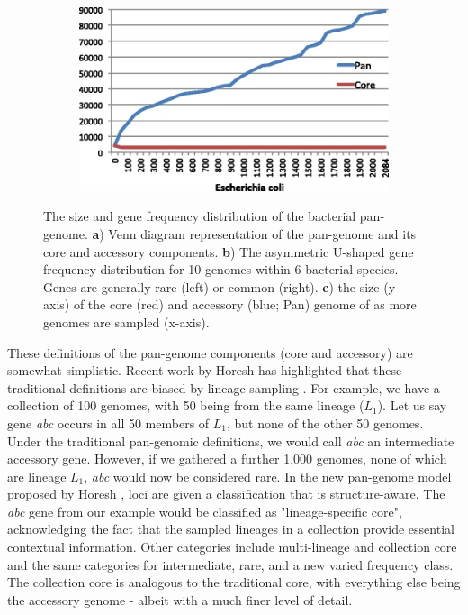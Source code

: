 \begin{figure}
\begin{subfigure}[b]{0.475\textwidth}
         \caption{}
         \label{fig:pangenome-freq}
     \end{subfigure}
     \begin{subfigure}[b]{0.8\textwidth}
        \includegraphics[width=1\linewidth]{Chapter0/Figs/pangenome-size.png}
        \centering
        \caption{}
        \label{fig:pangenome-size}
     \end{subfigure}
    \caption{The size and gene frequency distribution of the bacterial pan-genome. \textbf{a}) Venn diagram representation of the pan-genome and its core and accessory components. \textbf{b}) The asymmetric U-shaped gene frequency distribution for 10 genomes within 6 bacterial species. Genes are generally rare (left) or common (right). \textbf{c}) the size (y-axis) of the core (red) and accessory (blue; Pan) genome of \ecoli{} as more genomes are sampled (x-axis).}
        \label{fig:pangenome}
\end{figure}

\noindent
These definitions of the pan-genome components (core and accessory) are somewhat simplistic. Recent work by Horesh \etal{} has highlighted that these traditional definitions are biased by lineage sampling \cite{Horesh2021}. For example, we have a collection of 100 genomes, with 50 being from the same lineage ($L_1$). Let us say gene \textit{abc} occurs in all 50 members of $L_1$, but none of the other 50 genomes. Under the traditional pan-genomic definitions, we would call \textit{abc} an intermediate accessory gene. However, if we gathered a further 1,000 genomes, none of which are lineage $L_1$, \textit{abc} would now be considered rare. In the new pan-genome model proposed by Horesh \etal{}, loci are given a classification that is structure-aware. The \textit{abc} gene from our example would be classified as "lineage-specific core", acknowledging the fact that the sampled lineages in a collection provide essential contextual information. Other categories include multi-lineage and collection core and the same categories for intermediate, rare, and a new varied frequency class. The collection core is analogous to the traditional core, with everything else being the accessory genome - albeit with a much finer level of detail.

